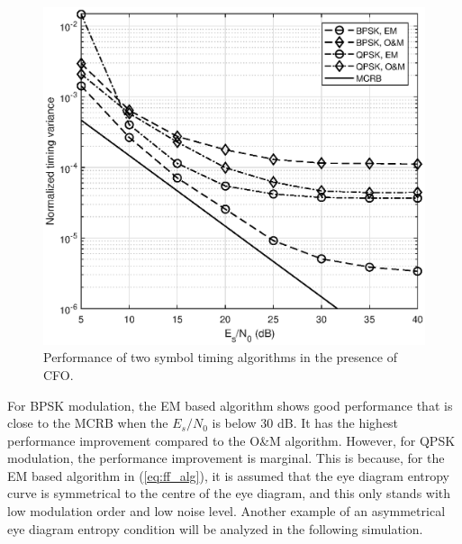 \documentclass[12pt, draftclsnofoot, onecolumn]{IEEEtran}
\begin{document}
\begin{figure}[ht]
\centering
\includegraphics[width=3.1 in]{pic/per_timing_frq-k.eps}
\caption{Performance of two symbol timing algorithms in the presence of CFO.}
\label{fig:timing_frq_per} 
\end{figure}  

For BPSK modulation, the EM based algorithm shows good performance that is close to the MCRB when the \(E_s/N_0\) is below 30 dB.
It has the highest performance improvement compared to the O\&M algorithm.
However, for QPSK modulation, the performance improvement is marginal.
This is because, for the EM based algorithm in (\ref{eq:ff_alg}), it is assumed that the eye diagram entropy curve is symmetrical to the centre of the eye diagram, and this only stands with low modulation order and low noise level.
Another example of an asymmetrical eye diagram entropy condition will be analyzed in the following simulation. 
\end{document}

